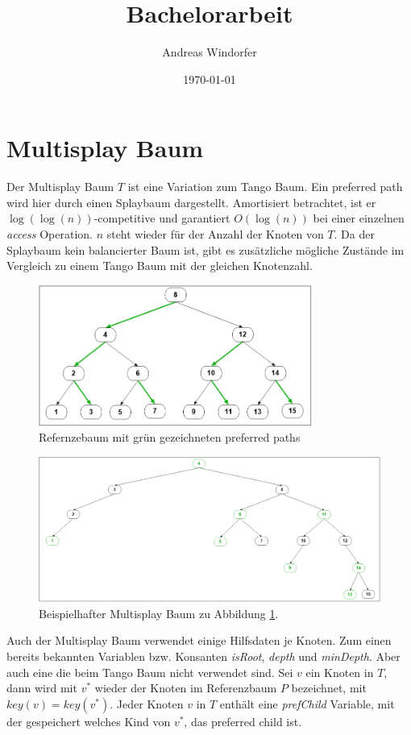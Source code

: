 \documentclass[a4paper,12pt]{article}
\title{Bachelorarbeit}
\author{
	Andreas Windorfer\\
}
\date{\today}
\begin{document}
\maketitle
\newpage

\newpage
\tableofcontents


\newpage


\section{Multisplay Baum}
Der Multisplay Baum \cite{multisplay} $T$ ist eine Variation zum Tango Baum. Ein preferred path wird hier durch einen Splaybaum dargestellt. Amortisiert betrachtet, ist er $\log\left(\log\left(n\right)\right)$-competitive und garantiert $O\left(\log \left(n\right)\right)$ bei einer einzelnen {\textit{access}} Operation. $n$ steht wieder für der Anzahl der Knoten von $T$. Da der Splaybaum kein balancierter Baum ist, gibt es zusätzliche mögliche Zustände im Vergleich zu einem Tango Baum mit der gleichen Knotenzahl.
\begin{figure}[h]
	\centering
	\includegraphics[width= 0.8\textwidth]{"Medien/Multisplay/referenzTree"}
	\caption {Refernzebaum mit grün gezeichneten preferred paths }
	\label{fig:referenzTree}
\end{figure} 
\begin{figure}[h]
	\centering
	\includegraphics[width= 1\textwidth]{"Medien/Multisplay/pfadRepresentation"}
	\caption {Beispielhafter Multisplay Baum zu Abbildung \ref{fig:referenzTree}.}
	\label{fig:pfadRepresentation}
\end{figure} 
Auch der Multisplay Baum verwendet einige Hilfsdaten je Knoten. Zum einen bereits bekannten Variablen bzw. Konsanten \textit{isRoot}, \textit{depth} und \textit{minDepth}. Aber auch eine die beim Tango Baum nicht verwendet sind. Sei $v$ ein Knoten in $T$, dann wird mit $v^*$  wieder der Knoten im Referenzbaum $P$ bezeichnet, mit $\mathit{key}\left(v\right) = \mathit{key}\left(v^*\right)$. Jeder Knoten $v$ in $T$ enthält eine \textit{prefChild} Variable, mit der gespeichert welches Kind von $v^*$, das preferred child ist. 
\end{document}
